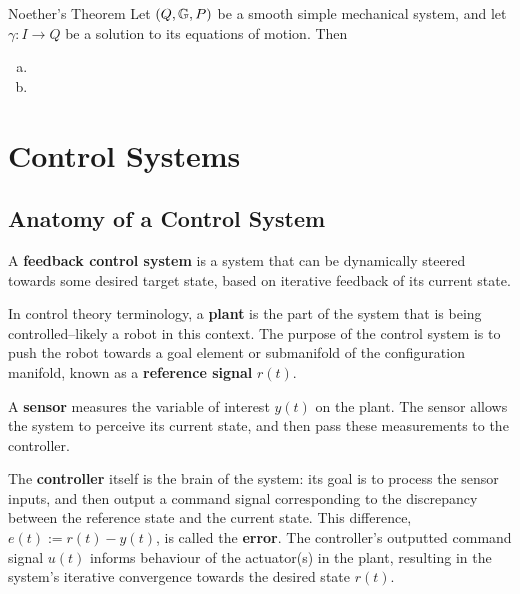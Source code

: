 \documentclass[main.tex]{subfiles}
\begin{document}
\begin{boxthm}{Noether's Theorem\cite{bullo2019geometric}%
}
Let $\del{Q,\mbbg,P}$ be a smooth simple mechanical system, and let $\gamma:I\to Q$ be a solution to its equations of motion. Then
\begin{enumerate}[(a)]
    \item 
    \item 
\end{enumerate}
\end{boxthm}


\section{Control Systems}
\subsection{Anatomy of a Control System}
A \textbf{feedback control system} is a system that can be dynamically steered towards some desired target state, based on iterative feedback of its current state\cite{franklin2002feedback}.

In control theory terminology, a \textbf{plant} is the part of the system that is being controlled--likely a robot in this context. The purpose of the control system is to push the robot towards a goal element or submanifold of the configuration manifold, known as a \textbf{reference signal} $r(t)$.

A \textbf{sensor} measures the variable of interest $y(t)$ on the plant. The sensor allows the system to perceive its current state, and then pass these measurements to the controller\cite{franklin2002feedback}. 

The \textbf{controller} itself is the brain of the system: its goal is to process the sensor inputs, and then output a command signal corresponding to the discrepancy between the reference state and the current state. This difference, $e(t):=r(t)-y(t)$, is called the \textbf{error}. The controller's outputted command signal $u(t)$ informs behaviour of the actuator(s) in the plant, resulting in the system's iterative convergence towards the desired state $r(t).$
\end{document}

